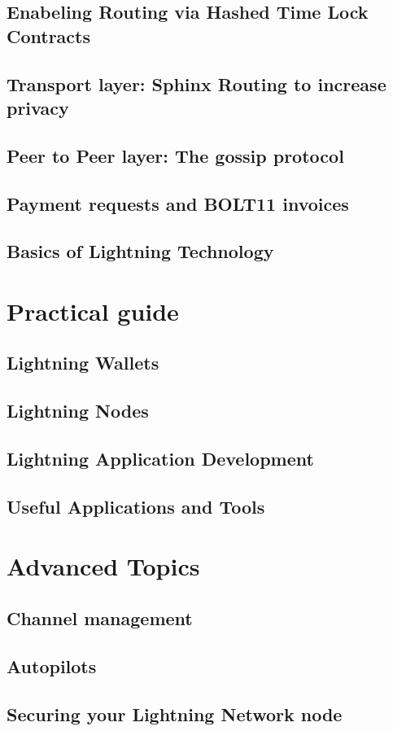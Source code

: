 \documentclass[a4paper,12pt,oneside,openany]{book}
\begin{document}
\section{Enabeling Routing via Hashed Time Lock Contracts}
\section{Transport layer: Sphinx Routing to increase privacy}
\section{Peer to Peer layer: The gossip protocol}
\section{Payment requests and BOLT11 invoices}
\section{Basics of Lightning Technology}
\chapter{Practical guide}
\section{Lightning Wallets}
\section{Lightning Nodes}
\section{Lightning Application Development}
\section{Useful Applications and Tools}
\chapter{Advanced Topics}
\section{Channel management}
\section{Autopilots}
\section{Securing your Lightning Network node}
\end{document}
